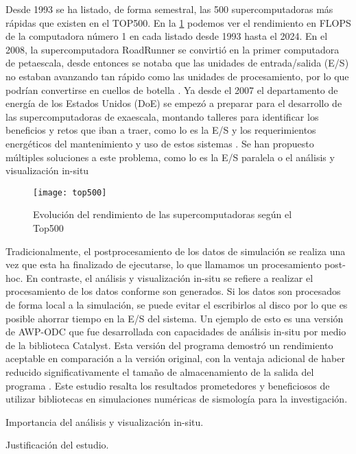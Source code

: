 Desde 1993 se ha listado, de forma semestral, las 500 supercomputadoras más rápidas que existen en el TOP500. En la \cref{fig:top500} podemos ver el rendimiento en FLOPS de la computadora número 1 en cada listado desde 1993 hasta el 2024. En el 2008, la supercomputadora RoadRunner se convirtió en la primer computadora de petaescala, desde entonces se notaba que las unidades de entrada/salida (E/S) no estaban avanzando tan rápido como las unidades de procesamiento, por lo que podrían convertirse en cuellos de botella \cite{Narayan2009}. Ya desde el 2007 el departamento de energía de los Estados Unidos (DoE) se empezó a preparar para el desarrollo de las supercomputadoras de exaescala, montando talleres para identificar los beneficios y retos que iban a traer, como lo es la E/S y los requerimientos energéticos del mantenimiento y uso de estos sistemas \cite{Messina2017}. Se han propuesto múltiples soluciones a este problema, como lo es la E/S paralela \cite{Byna2022} o el análisis y visualización in-situ \cite{akira_kageyama_approach_2014}


\begin{figure}[h]
  \texttt{[image: top500]}
  \caption{Evolución del rendimiento de las supercomputadoras según el Top500\cite{top500}}
  \label{fig:top500}
\end{figure}

Tradicionalmente, el postprocesamiento de los datos de simulación se realiza una vez que esta ha finalizado de ejecutarse, lo que llamamos un procesamiento post-hoc. En contraste, el análisis y visualización in-situ se refiere a realizar el procesamiento de los datos conforme son generados. Si los datos son procesados de forma local a la simulación, se puede evitar el escribirlos al disco por lo que es posible ahorrar tiempo en la E/S del sistema. Un ejemplo de esto es una versión de AWP-ODC que fue desarrollada con capacidades de análisis in-situ por medio de la biblioteca Catalyst. Esta versión del programa demostró un rendimiento aceptable en comparación a la versión original, con la ventaja adicional de haber reducido significativamente el tamaño de almacenamiento de la salida del programa \cite{mu_-situ_2019}. Este estudio resalta los resultados prometedores y beneficiosos de utilizar bibliotecas en simulaciones numéricas de sismología para la investigación.

Importancia del análisis y visualización in-situ.

Justificación del estudio.

